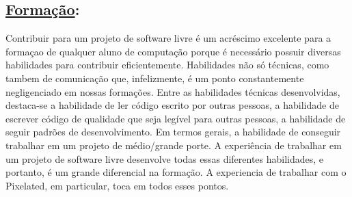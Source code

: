 \subsection*{\underline{Formação}:}

Contribuir para um projeto de software livre é um acréscimo excelente para a formaçao de qualquer aluno de computação porque é necessário possuir diversas habilidades para contribuir eficientemente. Habilidades não só técnicas, como tambem de comunicação que, infelizmente, é um ponto constantemente negligenciado em nossas formações.
Entre as habilidades técnicas desenvolvidas, destaca-se a habilidade de ler código escrito por outras pessoas, a habilidade de escrever código de qualidade que seja legível para outras pessoas, a habilidade de seguir padrões de desenvolvimento. Em termos gerais, a habilidade de conseguir trabalhar em um projeto de médio/grande porte.
A experiência de trabalhar em um projeto de software livre desenvolve todas essas diferentes habilidades, e portanto, é um grande diferencial na formação.
A experiencia de trabalhar com o Pixelated, em particular, toca em todos esses pontos.
